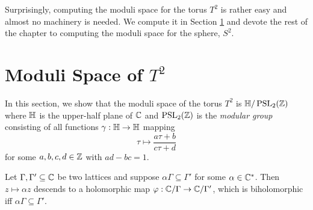 \documentclass[../Moduli_Spaces_of_Riemann_Surfaces.tex]{subfiles}
\begin{document}
    Surprisingly, computing the moduli space for the torus $T^2$ is rather easy and almost no machinery is needed. We compute it in Section \ref{2.1} and devote the rest of the chapter to computing the moduli space for the sphere, $S^2$.
    \section{Moduli Space of $T^2$}\label{2.1}
    In this section, we show that the moduli space of the torus $T^2$ is $\mathbb{H}/\operatorname{PSL}_{2}\!\left(\mathbb{Z}\right)$ where $\mathbb{H}$ is the upper-half plane of $\mathbb{C}$ and $\operatorname{PSL}_{2}\!\left(\mathbb{Z}\right)$ is the \textit{modular group} consisting of all functions $\gamma:\mathbb{H}\to\mathbb{H}$ mapping
    \begin{equation*}
        \tau\mapsto\frac{a\tau+b}{c\tau+d}
    \end{equation*}
    for some $a,b,c,d\in\mathbb{Z}$ with $ad-bc=1$.
    \begin{lemma}\label{2.1:lem:moduli_space_torus_1}
        Let $\Gamma,\Gamma'\subseteq\mathbb{C}$ be two lattices and suppose $\alpha\Gamma\subseteq\Gamma'$ for some $\alpha\in\mathbb{C}^\ast$. Then $z\mapsto\alpha z$ descends to a holomorphic map $\varphi:\mathbb{C}/\Gamma\to\mathbb{C}/\Gamma'$, which is biholomorphic iff $\alpha\Gamma\subseteq\Gamma'$.
    \end{lemma}\vspace{-0.08in}
\end{document}
